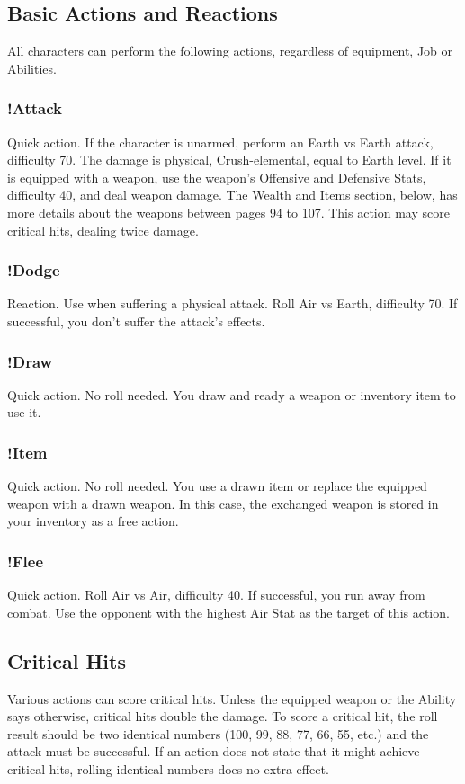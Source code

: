 \begin{multicols}{2}
\subsection{Basic Actions and Reactions}
\label{subsec:basicactions}
All characters can perform the following
actions, regardless of equipment, Job or Abilities.

\subsubsection{!Attack}
Quick action. If the character is unarmed,
perform an Earth vs Earth attack, difficulty 70. The
damage is physical, Crush-elemental, equal to
Earth level. If it is equipped with a weapon, use the
weapon’s Offensive and Defensive Stats, difficulty
40, and deal weapon damage. The Wealth and
Items section, below, has more details about the
weapons between pages 94 to 107. This action
may score critical hits, dealing twice damage.

\subsubsection{!Dodge}
Reaction. Use when suffering a physical
attack. Roll Air vs Earth, difficulty 70. If successful,
you don’t suffer the attack’s effects.

\subsubsection{!Draw}
Quick action. No roll needed. You draw and
ready a weapon or inventory item to use it.

\subsubsection{!Item}
Quick action. No roll needed. You use a
drawn item or replace the equipped weapon with
a drawn weapon. In this case, the exchanged
weapon is stored in your inventory as a free action.

\subsubsection{!Flee}
Quick action. Roll Air vs Air, difficulty 40. If
successful, you run away from combat. Use the
opponent with the highest Air Stat as the target of
this action.

\subsection{Critical Hits}
Various actions can score critical hits.
Unless the equipped weapon or the Ability says
otherwise, critical hits double the damage. To
score a critical hit, the roll result should be two
identical numbers (100, 99, 88, 77, 66, 55, etc.) and
the attack must be successful. If an action does not
state that it might achieve critical hits, rolling
identical numbers does no extra effect.


\end{multicols}
